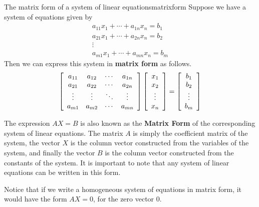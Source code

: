 \begin{definition}{The matrix form of a system of linear equations}{matrixform}
Suppose we have a system of equations given by
\begin{equation*}
\begin{array}{c}
a_{11}x_{1}+\cdots +a_{1n}x_{n}=b_{1} \\
a_{21}x_{1}+ \cdots + a_{2n}x_{n} = b_{2} \\
\vdots \\
a_{m1}x_{1}+\cdots +a_{mn}x_{n}=b_{m}
\end{array}
\end{equation*}
Then we can express this system in \textbf{matrix form} as follows.
\begin{equation*}
\left[
\begin{array}{cccc}
a_{11} & a_{12} & \cdots & a_{1n} \\
a_{21} & a_{22} & \cdots & a_{2n} \\
\vdots & \vdots & \ddots & \vdots \\
a_{m1} & a_{m2} & \cdots & a_{mn}
\end{array}
\right]
\left[
\begin{array}{c}
x_{1} \\
x_{2} \\
\vdots \\
x_{n}
\end{array}
\right]
=
\left[
\begin{array}{c}
b_{1}\\
b_{2}\\
\vdots \\
b_{m}
\end{array}
\right]
\end{equation*}
 
\end{definition}

The expression $AX=B$ is also known as the \textbf{Matrix Form} of the
corresponding system of linear equations. The
matrix $A$ is simply the coefficient matrix of the system, the vector
$X$ is the column vector constructed from the variables of the system,
and finally the vector $B$ is the column vector constructed from the constants
of the system.  It is important to note that any system of linear
equations can be written in this form.

Notice that if we write a homogeneous system of equations in matrix form, it would have the form
$AX=0$, for the zero vector $0$.

